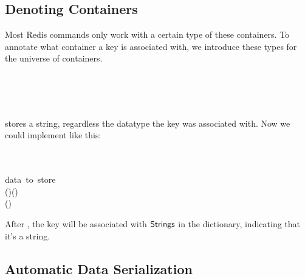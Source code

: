 \subsection{Denoting Containers}
Most Redis commands only work with a certain type of these containers. To
 annotate what container a key is associated with, we introduce these types for
 the universe of containers.

\begin{hscode}\SaveRestoreHook
{}%
%
\>[B]{}\;\<[E]%
\\
\>[B]{}\;\<[E]%
\\
\>[B]{}\;\<[E]%
\\
\>[B]{}\<[E]%
\ColumnHook
\end{hscode}\resethooks

 stores a string, regardless the datatype the key was
 associated with. Now we could implement  like this:

\begin{hscode}\SaveRestoreHook
{}%
%
%
%
\>[B]{}\mathbin{::}\;\<[E]%
\\
\>[B]{}\<[5]%
\>[5]{}\Rightarrow {}\;\<[E]%
\\
\>[B]{}\<[5]%
\>[5]{}\to {}\<[25]%
\>[25]{}\mbox{\onelinecomment  data to store}{}\<[E]%
\\
\>[B]{}\<[5]%
\>[5]{}\to {}\;\;(\;\;\;)\;(\;\;){}\<[E]%
\\
\>[B]{}\;\;\mathrel{=}\mathbin{\$}\;(\;)\;\<[E]%
\ColumnHook
\end{hscode}\resethooks

After , the key will be associated with
 \ensuremath{\Conid{Strings}} in the dictionary, indicating that it's a string.

\subsection{Automatic Data Serialization}

